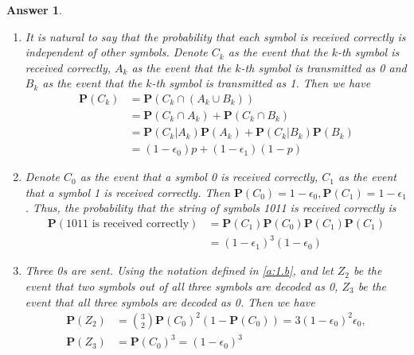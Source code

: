 \documentclass[utf8]{article}
\theoremstyle{definition}%
\theoremstyle{plain}%
\newtheorem{answer}{Answer} %
\begin{document}
\begin{answer} ~
\begin{enumerate}[label=(\alph*)]
    \item It is natural to say that the probability that each symbol is received correctly is independent of other symbols. Denote $C_k$ as the event that the $k$-th symbol is received correctly, $A_k$ as the event that the $k$-th symbol is transmitted as 0 and $B_k$ as the event that the $k$-th symbol is transmitted as 1. Then we have
    \begin{equation}
    \begin{aligned}
        \mathbf{P}(C_k) &= \mathbf{P}\left(C_k \cap (A_k \cup B_k)\right) \\
        &= \mathbf{P}(C_k \cap A_k) + \mathbf{P}(C_k \cap B_k) \\
        &= \mathbf{P}(C_k | A_k) \mathbf{P}(A_k) + \mathbf{P}(C_k | B_k) \mathbf{P}(B_k) \\
        &= (1-\epsilon_0)p + (1-\epsilon_1)(1-p)
    \end{aligned}
    \end{equation}
    \item \label{a:1.b} Denote $C_0$ as the event that a symbol 0 is received correctly, $C_1$ as the event that a symbol 1 is received correctly. Then $\mathbf{P}(C_0) = 1-\epsilon_0, \mathbf{P}(C_1) = 1-\epsilon_1$.
    Thus, the probability that the string of symbols 1011 is received correctly is
    \begin{equation}
    \begin{aligned}
        \mathbf{P}(\text{1011 is received correctly}) &= \mathbf{P}(C_1) \mathbf{P}(C_0) \mathbf{P}(C_1) \mathbf{P}(C_1) \\
        &= (1-\epsilon_1)^3(1-\epsilon_0)
    \end{aligned}
    \end{equation}
    \item Three 0s are sent. Using the notation defined in \ref{a:1.b}, and let $Z_2$ be the event that two symbols out of all three symbols are decoded as 0, $Z_3$ be the event that all three symbols are decoded as 0. Then we have
    \begin{equation}
    \begin{aligned}
        \mathbf{P}(Z_2) &= \binom{3}{2}  \mathbf{P}(C_0)^2 \left(1 - \mathbf{P}(C_0)\right) = 3(1-\epsilon_0)^2\epsilon_0, \\
        \mathbf{P}(Z_3) &= \mathbf{P}(C_0)^3 = (1-\epsilon_0)^3
    \end{aligned}

\end{equation}
\end{enumerate}
\end{answer}
\end{document}
